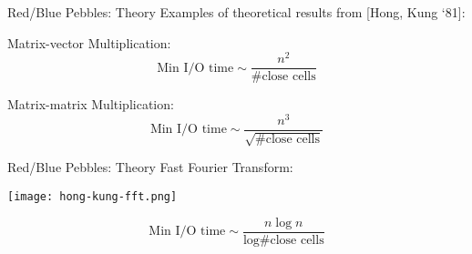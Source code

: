\documentclass[english,compress]{beamer}
\begin{document}
\begin{frame}{Red/Blue Pebbles: Theory}
  Examples of theoretical results from [Hong, Kung `81]:

  \bigskip
  Matrix-vector Multiplication:
  \[
    \text{Min I/O time}\sim \frac{n^2}{\text{\# close cells}}
  \]

  \bigskip
  Matrix-matrix Multiplication:
  \[
    \text{Min I/O time}\sim \frac{n^3}{\sqrt{\text{\# close cells}}}
  \]
\end{frame}

\begin{frame}{Red/Blue Pebbles: Theory}
  Fast Fourier Transform:
  \begin{center}
    \texttt{[image: hong-kung-fft.png]}
  \end{center}
  \[
    \text{Min I/O time}\sim \frac{n \log n}{\log \text{\# close cells}}
  \]
\end{frame}
\end{document}
